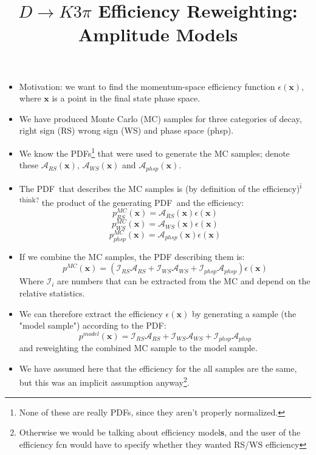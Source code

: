 \documentclass{article}
\title{$D\rightarrow K3\pi$ Efficiency Reweighting: Amplitude Models}
\begin{document}
\maketitle
\begin{itemize}
    \item Motivation: we want to find the momentum-space efficiency function $\epsilon(\mathbf{x})$,
          where $\mathbf{x}$ is a point in the final state phase space.
    \item We have produced Monte Carlo (MC) samples for three categories of decay, right sign (RS) wrong sign (WS) and phase space (phsp).
    \item We know the PDFs\footnote[1]{None of these are really PDFs, since they aren't properly normalized.} that were used to generate the MC samples; denote these
          $\mathcal{A}_{RS}(\mathbf{x})$, $\mathcal{A}_{WS}(\mathbf{x})$ and $\mathcal{A}_{phsp}(\mathbf{x})$.
    \item The PDF\footnotemark\ that describes the MC samples is (by definition of the efficiency)\textsuperscript{i think?} the product of the generating PDF\footnotemark\ and the efficiency:
          \begin{equation*}
              p^{MC}_{RS}(\mathbf{x}) = \mathcal{A}_{RS}(\mathbf{x})\epsilon(\mathbf{x})
          \end{equation*}
          \begin{equation}
              p^{MC}_{WS}(\mathbf{x}) = \mathcal{A}_{WS}(\mathbf{x})\epsilon(\mathbf{x})
          \end{equation}
          \begin{equation*}
              p^{MC}_{phsp}(\mathbf{x}) = \mathcal{A}_{phsp}(\mathbf{x})\epsilon(\mathbf{x})
          \end{equation*}
    \item If we combine the MC samples, the PDF describing them is:
          \begin{equation}
              p^{MC}(\mathbf{x}) = (\mathcal{I}_{RS}\mathcal{A}_{RS}
              + \mathcal{I}_{WS}\mathcal{A}_{WS}
              + \mathcal{I}_{phsp}\mathcal{A}_{phsp})\epsilon(\mathbf{x})
          \end{equation}
          Where $\mathcal{I}_{i}$ are numbers that can be extracted from the MC and depend on the relative statistics.
    \item We can therefore extract the efficiency $\epsilon(\mathbf{x})$ by generating a sample (the "model sample") according to the PDF\footnotemark:
          \begin{equation}
              p^{model}(\mathbf{x}) = \mathcal{I}_{RS}\mathcal{A}_{RS}
              + \mathcal{I}_{WS}\mathcal{A}_{WS}
              + \mathcal{I}_{phsp}\mathcal{A}_{phsp}
          \end{equation}
          and reweighting the combined MC sample to the model sample.
    \item We have assumed here that the efficiency for the all samples are the same, but this was an implicit assumption anyway\footnote[2]{Otherwise we would be talking about efficiency model\textbf{s}, and the user of the efficiency fcn would have to specify whether they wanted RS/WS efficiency}.
\end{itemize}
\end{document}
